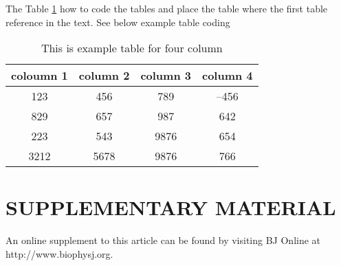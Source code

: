 \documentclass[a4paper,10pt,twoside]{article}
\newcommand{\BibTeX}{\textsc{Bib}\TeX}       %
\begin{document}
The Table \ref{tab1} how to code the tables and place the table where the first
table reference in the text. See below example table coding

\begin{table}[!bht]
\begin{center}
\caption{This is example table for four column}\label{tab1}
\begin{tabular}{cccc}\hline
coloumn 1 & column 2 & column 3 & column 4\\ \hline
123 & 456 & 789 & --456\\
829 & 657 & 987 & 642\\
223 & 543 & 9876& 654\\
3212 & 5678 & 9876 & 766\\ \hline
\end{tabular}
\end{center}
\end{table}

\section*{SUPPLEMENTARY MATERIAL}

An online supplement to this article can be found by visiting BJ Online at http://www.biophysj.org.













\newpage

\listoffigures

\newpage

\listoftables


\end{document}

